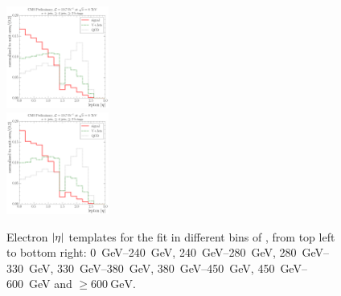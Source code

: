 \begin{figure}[!htbp]
  	{\includegraphics[width=0.3\textwidth]{measurement/HT/central/fit_templates/electron_templates_bin_450-600}}\\
  	{\includegraphics[width=0.3\textwidth]{measurement/HT/central/fit_templates/electron_templates_bin_600-inf}}
    \caption{Electron $\lvert \eta \rvert$ templates for the fit in different bins of \HT,
    from top left to bottom right: \SIrange{0}{240}{\GeV}, \SIrange{240}{280}{\GeV},
    \SIrange{280}{330}{\GeV}, \SIrange{330}{380}{\GeV}, \SIrange{380}{450}{\GeV},
    \SIrange{450}{600}{\GeV} and $\geq \SI{600}{\GeV}$.}
    \label{fig:fit_tempaltes_HT_electron}
\end{figure}

